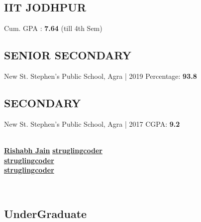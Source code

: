 \documentclass[a4paper]{MagicalCV}
\begin{document}
\lastupdated


\begin{minipage}[t]{0.33\textwidth} 

\newline
\subsection{IIT JODHPUR}
\newline
{}
Cum. GPA :
\textbf{ 7.64}
(till 4th Sem)
\newline
\subsection{SENIOR SECONDARY}
New St. Stephen’s Public School, Agra |
2019 Percentage: {\bf 93.8}
\newline
\subsection{SECONDARY}
New St. Stephen’s Public School, Agra |
2017 CGPA: {\bf 9.2}


\sectionsep

\\
 \href{https://www.linkedin.com/in/rishabh-jain-653611237/}{\bf Rishabh Jain}
 \href{https://github.com/struglingcoder/}{\bf struglingcoder}\\
\textbullet{}  \href{https://www.codechef.com/users/struglingcoder/}{\bf struglingcoder}\\
\newline
\textbullet{}
\href{https://codeforces.com/profile/strugling_coder/}{\bf struglingcoder}

\sectionsep

\\
\bigskip
\subsection{UnderGraduate}


\end{minipage}
\end{document}
